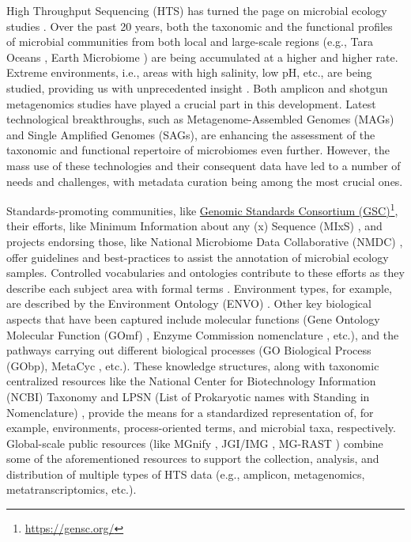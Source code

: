    High Throughput Sequencing (HTS) has turned the page on microbial ecology studies \citep{nilsson2019mycobiome}. 
   Over the past 20 years, both the taxonomic and the functional profiles of microbial communities from both local and large-scale regions (e.g., Tara Oceans \citep{pesant2015open}, Earth Microbiome \citep{gilbert2014earth}) are being accumulated at a higher and higher rate. 
   Extreme environments, i.e., areas with high salinity, low pH, etc., are being studied, providing us with unprecedented insight \citep{shu2021microbial}. 
   Both amplicon and shotgun metagenomics studies have played a crucial part in this development. Latest technological breakthroughs, such as Metagenome-Assembled Genomes (MAGs) and Single Amplified Genomes (SAGs), are enhancing the assessment of the taxonomic and functional repertoire of microbiomes even further. 
   However, the mass use of these technologies and their consequent data have led to a number of needs and challenges, with metadata curation being among the most crucial ones.

   Standards-promoting communities, like \href{https://gensc.org/}{Genomic Standards Consortium (GSC)}\footnote{
      \href{https://gensc.org/}{https://gensc.org/}
   }, their efforts, like Minimum Information about any (x) Sequence (MIxS) \citep{yilmaz2011minimum}, and projects endorsing those, like National Microbiome Data Collaborative (NMDC) \citep{wood2020national, vangay2021microbiome}, offer guidelines and best-practices to assist the annotation of microbial ecology samples. 
   Controlled vocabularies and ontologies contribute to these efforts as they describe each subject area with formal terms \citep{walls2014semantics}. 
   Environment types, for example, are described by the Environment Ontology (ENVO) \citep{buttigieg2016environment}. 
   Other key biological aspects that have been captured include molecular functions (Gene Ontology Molecular Function (GOmf) \citep{ashburner2000gene, gene2021gene}, Enzyme Commission nomenclature \citep{noauthor_1999}, etc.), and the pathways carrying out different biological processes (GO Biological Process (GObp), MetaCyc \citep{caspi2020metacyc}, etc.). 
   These knowledge structures, along with taxonomic centralized resources like the National Center for Biotechnology Information (NCBI) Taxonomy \citep{schoch2020ncbi}
   and LPSN (List of Prokaryotic names with Standing in Nomenclature) \citep{parte2020list}, 
   provide the means for a standardized representation of, for example, environments, process-oriented terms, and microbial taxa, respectively. Global-scale public resources (like MGnify \citep{mitchell2020mgnify}, 
   JGI/IMG \citep{chen2021img}, 
   MG-RAST \citep{wilke2015restful}) 
   combine some of the aforementioned resources to support the collection, analysis, and distribution of multiple types of HTS data (e.g., amplicon, metagenomics, metatranscriptomics, etc.).

